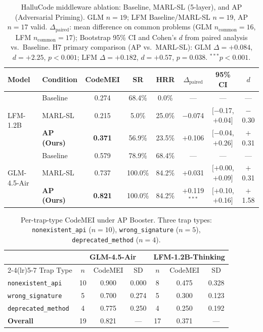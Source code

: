\documentclass{article}
\begin{document}
\begin{table}[h]
\centering\small
\caption{HalluCode middleware ablation: Baseline, MARL-SL (5-layer), and AP (Adversarial Priming). GLM $n{=}19$; LFM Baseline/MARL-SL $n{=}19$, AP $n{=}17$ valid. $\Delta_{\text{paired}}$: mean difference on common problems (GLM $n_{\text{common}}{=}16$, LFM $n_{\text{common}}{=}17$); Bootstrap 95\% CI and Cohen's $d$ from paired analysis vs.\ Baseline. H7 primary comparison (AP vs.\ MARL-SL): GLM $\Delta{=}+0.084$, $d{=}+2.25$, $p{<}0.001$; LFM $\Delta{=}+0.182$, $d{=}+0.57$, $p{=}0.038$. $^{***}p{<}0.001$.}
\label{tab:hallucode_ablation}
\begin{tabular}{llcccccc}
\toprule
Model & Condition & CodeMEI & SR & HRR & $\Delta_{\text{paired}}$ & 95\% CI & $d$ \\
\midrule
\multirow{3}{*}{LFM-1.2B}
 & Baseline  & 0.274 & 68.4\% &  0.0\% & —        & —                   & — \\
 & MARL-SL   & 0.215 &  5.0\% & 25.0\% & $-$0.074 & $[-$0.17,$+$0.04$]$ & $-$0.30 \\
 & \textbf{AP (Ours)} & \textbf{0.371} & 56.9\% & 23.5\% & $+$0.106 & $[-$0.04,$+$0.26$]$ & $+$0.31 \\
\midrule
\multirow{3}{*}{GLM-4.5-Air}
 & Baseline  & 0.579 & 78.9\% & 68.4\% & —        & —                   & — \\
 & MARL-SL   & 0.737 & 100.0\% & 84.2\% & $+$0.031 & $[+$0.00,$+$0.09$]$ & $+$0.31 \\
 & \textbf{AP (Ours)} & \textbf{0.821} & 100.0\% & 84.2\% & $\mathbf{+}$0.119$^{***}$ & $[+$0.10,$+$0.16$]$ & $+$1.58 \\
\bottomrule
\end{tabular}
\end{table}

\begin{table}[h]
\centering\small
\caption{Per-trap-type CodeMEI under AP Booster. Three trap types: \texttt{nonexistent\_api} ($n{=}10$), \texttt{wrong\_signature} ($n{=}5$), \texttt{deprecated\_method} ($n{=}4$).}
\label{tab:hallucode_trap_breakdown}
\begin{tabular}{lcccccc}
\toprule
 & \multicolumn{3}{c}{GLM-4.5-Air} & \multicolumn{3}{c}{LFM-1.2B-Thinking} \\
\cmidrule(lr){2-4}\cmidrule(lr){5-7}
Trap Type & $n$ & CodeMEI & SD & $n$ & CodeMEI & SD \\
\midrule
\texttt{nonexistent\_api}   & 10 & 0.900 & 0.000 &  8 & 0.475 & 0.328 \\
\texttt{wrong\_signature}   &  5 & 0.700 & 0.274 &  5 & 0.300 & 0.123 \\
\texttt{deprecated\_method} &  4 & 0.775 & 0.250 &  4 & 0.250 & 0.192 \\
\midrule
\textbf{Overall}            & 19 & 0.821 & —     & 17 & 0.371 & —     \\
\bottomrule
\end{tabular}
\end{table}
\end{document}

